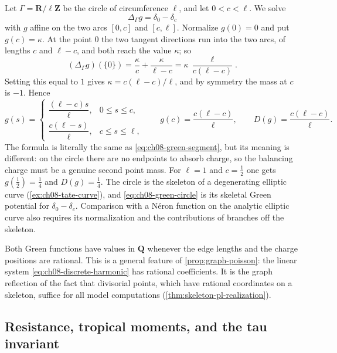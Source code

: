 \begin{example}
\label{ex:ch08-green-circle}
Let $\Gamma=\mathbf R/\ell\mathbf Z$ be the circle of circumference $\ell$,
and let $0<c<\ell$.  We solve
\[
                 \Delta_\Gamma g=\delta_0-\delta_c
\]
with $g$ affine on the two arcs $[0,c]$ and $[c,\ell]$.  Normalize $g(0)=0$
and put $g(c)=\kappa$.  At the point $0$ the two tangent directions run into
the two arcs, of lengths $c$ and $\ell-c$, and both reach the value $\kappa$;
so
\[
 (\Delta_\Gamma g)(\{0\})
   =\frac{\kappa}{c}+\frac{\kappa}{\ell-c}
   =\kappa\,\frac{\ell}{c(\ell-c)} .
\]
Setting this equal to $1$ gives $\kappa=c(\ell-c)/\ell$, and by symmetry the
mass at $c$ is $-1$.  Hence
\begin{equation}
\label{eq:ch08-green-circle}
 g(s)=
 \begin{cases}
  \dfrac{(\ell-c)s}{\ell},& 0\leq s\leq c,\\[2mm]
  \dfrac{c(\ell-s)}{\ell},& c\leq s\leq\ell,
 \end{cases}
 \qquad
 g(c)=\frac{c(\ell-c)}{\ell},
 \qquad
 D(g)=\frac{c(\ell-c)}{\ell} .
\end{equation}
The formula is literally the same as \eqref{eq:ch08-green-segment}, but its
meaning is different: on the circle there are no endpoints to absorb charge,
so the balancing charge must be a genuine second point mass.  For $\ell=1$
and $c=\tfrac12$ one gets $g(\tfrac12)=\tfrac14$ and $D(g)=\tfrac14$.  The
circle is the skeleton of a degenerating elliptic curve
(\cref{ex:ch08-tate-curve}), and \eqref{eq:ch08-green-circle} is its
skeletal Green potential for $\delta_0-\delta_c$.  Comparison with a
N\'eron function on the analytic elliptic curve also requires its
normalization and the contributions of branches off the skeleton.
\end{example}

\begin{remark}
\label{rem:ch08-rational-green}
Both Green functions have values in $\mathbf Q$ whenever the edge lengths and
the charge positions are rational.  This is a general feature of
\cref{prop:graph-poisson}: the linear system \eqref{eq:ch08-discrete-harmonic}
has rational coefficients.  It is the graph reflection of the fact that
divisorial points, which have rational coordinates on a skeleton, suffice for
all model computations (\cref{thm:skeleton-pl-realization}).
\end{remark}

\subsection{Resistance, tropical moments, and the tau invariant}
\label{sec:ch08-tau-moments}

